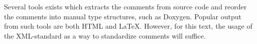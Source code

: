 \documentclass[fsharpNotes.tex]{subfiles}
\begin{document}

Several tools exists which extracts the comments from source code and reorder the comments into manual type structures, such as Doxygen. Popular output from such tools are both HTML and \LaTeX. However, for this text, the usage of the XML-standard as a way to standardize comments will suffice.
\end{document}
